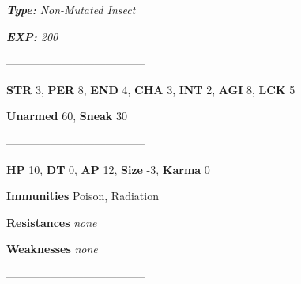 \documentclass[11pt,a4paper,twocolumn]{book}
\begin{document}
	\noindent
	\emph{\textbf{Type:} Non-Mutated Insect}
	
	\noindent
	\emph{\textbf{EXP:} 200}
	
%		
%	
%		

	--------------------------------------

	\noindent
	\textbf{STR} 3, \textbf{PER} 8, \textbf{END} 4, \textbf{CHA} 3, \textbf{INT} 2, \textbf{AGI} 8, \textbf{LCK} 5
	
	\noindent
	\textbf{Unarmed} 60, \textbf{Sneak} 30
	
	--------------------------------------
	
	\noindent
	\textbf{HP} 10, \textbf{DT} 0, \textbf{AP} 12, \textbf{Size} -3, \textbf{Karma} 0
	
	
	\noindent
	\textbf{Immunities} Poison, Radiation
	
	\noindent
	\textbf{Resistances} \emph{none} %
	
	\noindent
	\textbf{Weaknesses} \emph{none} %
	
	--------------------------------------
	
\end{document}
